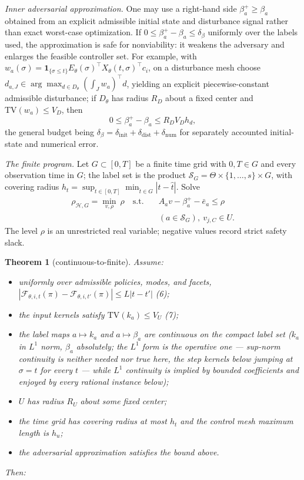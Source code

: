 \documentclass[10pt,twocolumn]{article}
\theoremstyle{plain}
\newtheorem{theorem}{Theorem}
\theoremstyle{definition}
\theoremstyle{remark}
\begin{document}
\emph{Inner adversarial approximation.} One may use a right-hand side
\(\beta_a^{+} \ge \beta_a\) obtained from an explicit admissible initial
state and disturbance signal rather than exact worst-case optimization. If
\(0 \le \beta_a^{+} - \beta_a \le \delta_\beta\) uniformly over the labels
used, the approximation is safe for nonviability: it weakens the adversary
and enlarges the feasible controller set. For example, with
\(w_a(\sigma) = \mathbf{1}_{\{\sigma \le t\}}
E_\theta(\sigma)^\top X_\theta(t,\sigma)^\top c_i\), on a disturbance mesh
choose \(d_{a,J} \in \arg\max_{d \in D_\theta} (\int_J w_a)^\top d\),
yielding an explicit piecewise-constant admissible disturbance; if
\(D_\theta\) has radius \(R_D\) about a fixed center and
\(\mathrm{TV}(w_a) \le V_D\), then
\[
0 \le \beta_a^{+} - \beta_a \le R_D V_D h_d,
\tag{4}
\]
the general budget being \(\delta_\beta = \delta_{\mathrm{init}} +
\delta_{\mathrm{dist}} + \delta_{\mathrm{num}}\) for separately accounted
initial-state and numerical error.

\emph{The finite program.} Let \(G \subset [0,T]\) be a finite time grid with \(0, T \in G\) and
every observation time in \(G\); the label set is the product
\(\mathscr{S}_G = \Theta \times \{1,\dots,s\} \times G\), with covering
radius \(h_t = \sup_{t \in [0,T]} \min_{\hat{t} \in G} |t -
\hat{t}|\). Solve
\begin{align*}
\rho_{\mathcal{H},G} = \min_{v, \rho}\ \rho
\quad \text{s.t.} \quad
& A_a v - \beta_a^{+} - \bar{e}_a \le \rho \\
& (a \in \mathscr{S}_G),
\ v_{j,C} \in U.
\tag{5}
\end{align*}
The level \(\rho\) is an unrestricted real variable; negative values record
strict safety slack.

\begin{theorem}[continuous-to-finite]\label{lp-thm:bridge}
Assume:
\begin{itemize}\setlength\itemsep{0em}
\item[(H1)] uniformly over admissible policies, modes, and facets,
\(|\mathcal{F}_{\theta,i,t}(\pi) - \mathcal{F}_{\theta,i,t'}(\pi)| \le
L|t - t'|\) (6);
\item[(H2)] the input kernels satisfy \(\mathrm{TV}(k_a) \le V_U\) (7);
\item[(H3)] the label maps \(a \mapsto k_a\) and \(a \mapsto \beta_a\)
are continuous on the compact label set (\(k_a\) in \(L^1\) norm,
\(\beta_a\) absolutely; the \(L^1\) form is the operative one ---
sup-norm continuity is neither needed nor true here, the step kernels
below jumping at \(\sigma = t\) for every \(t\) --- while \(L^1\)
continuity is implied by bounded coefficients and enjoyed by every
rational instance below);
\item[(H4)] \(U\) has radius \(R_U\) about some fixed center;
\item[(H5)] the time grid has covering radius at most \(h_t\) and the
control mesh maximum length is \(h_u\);
\item[(H6)] the adversarial approximation satisfies the bound above.
\end{itemize}
Then:
\end{theorem}
\end{document}
